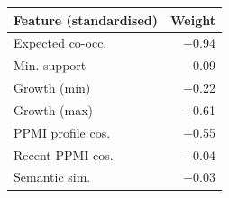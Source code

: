 \begin{tabular}{lr}
\toprule
Feature (standardised) & Weight\\
\midrule
Expected co-occ. & +0.94\\
Min. support & -0.09\\
Growth (min) & +0.22\\
Growth (max) & +0.61\\
PPMI profile cos. & +0.55\\
Recent PPMI cos. & +0.04\\
Semantic sim. & +0.03\\
\bottomrule
\end{tabular}